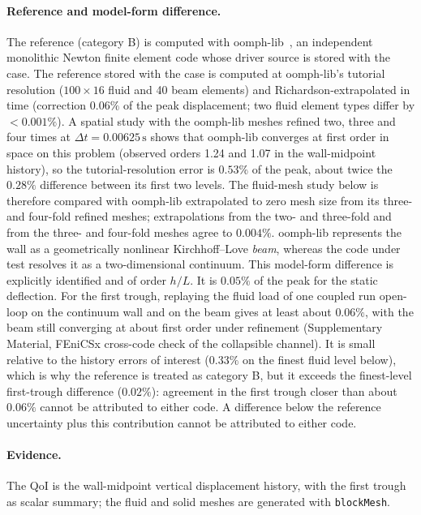 \paragraph{Reference and model-form difference.}
The reference (category B) is computed with oomph-lib~\citep{Heil2006}, an independent monolithic Newton finite element code whose driver source is stored with the case.
The reference stored with the case is computed at oomph-lib's tutorial resolution ($100\times16$ fluid and 40 beam elements) and Richardson-extrapolated in time (correction $0.06\%$ of the peak displacement; two fluid element types differ by $<0.001\%$). A spatial study with the oomph-lib meshes refined two, three and four times at $\Delta t = 0.00625\,\mathrm{s}$ shows that oomph-lib converges at first order in space on this problem (observed orders 1.24 and 1.07 in the wall-midpoint history), so the tutorial-resolution error is $0.53\%$ of the peak, about twice the $0.28\%$ difference between its first two levels. The fluid-mesh study below is therefore compared with oomph-lib extrapolated to zero mesh size from its three- and four-fold refined meshes; extrapolations from the two- and three-fold and from the three- and four-fold meshes agree to $0.004\%$.
oomph-lib represents the wall as a geometrically nonlinear Kirchhoff--Love \emph{beam}, whereas the code under test resolves it as a two-dimensional continuum.
This model-form difference is explicitly identified and of order $h/L$. It is $0.05\%$ of the peak for the static deflection. For the first trough, replaying the fluid load of one coupled run open-loop on the continuum wall and on the beam gives at least about $0.06\%$, with the beam still converging at about first order under refinement (Supplementary Material, FEniCSx cross-code check of the collapsible channel). It is small relative to the history errors of interest ($0.33\%$ on the finest fluid level below), which is why the reference is treated as category B, but it exceeds the finest-level first-trough difference ($0.02\%$): agreement in the first trough closer than about $0.06\%$ cannot be attributed to either code.
A difference below the reference uncertainty plus this contribution cannot be attributed to either code.

\paragraph{Evidence.}
The QoI is the wall-midpoint vertical displacement history, with the first trough as scalar summary; the fluid and solid meshes are generated with \texttt{blockMesh}.

